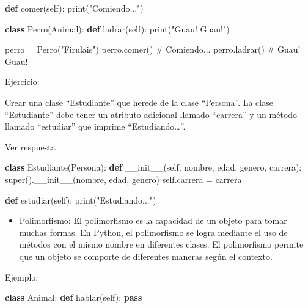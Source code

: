 \documentclass[
  a4paper,
  DIV=11,
  numbers=noendperiod,
  onepage,
  openany]{scrreprt}
\newenvironment{Shaded}{\begin{snugshade}}{\end{snugshade}}
\newcommand{\BuiltInTok}[1]{\textcolor[rgb]{0.00,0.23,0.31}{#1}}
\newcommand{\CommentTok}[1]{\textcolor[rgb]{0.37,0.37,0.37}{#1}}
\newcommand{\ControlFlowTok}[1]{\textcolor[rgb]{0.00,0.23,0.31}{\textbf{#1}}}
\newcommand{\FunctionTok}[1]{\textcolor[rgb]{0.28,0.35,0.67}{#1}}
\newcommand{\KeywordTok}[1]{\textcolor[rgb]{0.00,0.23,0.31}{\textbf{#1}}}
\newcommand{\NormalTok}[1]{\textcolor[rgb]{0.00,0.23,0.31}{#1}}
\newcommand{\OperatorTok}[1]{\textcolor[rgb]{0.37,0.37,0.37}{#1}}
\newcommand{\StringTok}[1]{\textcolor[rgb]{0.13,0.47,0.30}{#1}}
\newcommand{\VariableTok}[1]{\textcolor[rgb]{0.07,0.07,0.07}{#1}}
\providecommand{\tightlist}{%
  \setlength{\itemsep}{0pt}\setlength{\parskip}{0pt}}\usepackage{longtable,booktabs,array}
\begin{document}
\begin{tcolorbox}
\begin{Shaded}
\begin{Highlighting}[]
    \KeywordTok{def}\NormalTok{ comer(}\VariableTok{self}\NormalTok{):}
        \BuiltInTok{print}\NormalTok{(}\StringTok{"Comiendo..."}\NormalTok{)}

\KeywordTok{class}\NormalTok{ Perro(Animal):}
    \KeywordTok{def}\NormalTok{ ladrar(}\VariableTok{self}\NormalTok{):}
        \BuiltInTok{print}\NormalTok{(}\StringTok{"Guau! Guau!"}\NormalTok{)}

\NormalTok{perro }\OperatorTok{=}\NormalTok{ Perro(}\StringTok{"Firulais"}\NormalTok{)}
\NormalTok{perro.comer()  }\CommentTok{\# Comiendo...}
\NormalTok{perro.ladrar()  }\CommentTok{\# Guau! Guau!}
\end{Highlighting}
\end{Shaded}

Ejercicio:

Crear una clase ``Estudiante'' que herede de la clase ``Persona''. La
clase ``Estudiante'' debe tener un atributo adicional llamado
``carrera'' y un método llamado ``estudiar'' que imprime
``Estudiando\ldots{}''.

Ver respuesta

\begin{Shaded}
\begin{Highlighting}[]
\KeywordTok{class}\NormalTok{ Estudiante(Persona):}
    \KeywordTok{def} \FunctionTok{\_\_init\_\_}\NormalTok{(}\VariableTok{self}\NormalTok{, nombre, edad, genero, carrera):}
        \BuiltInTok{super}\NormalTok{().}\FunctionTok{\_\_init\_\_}\NormalTok{(nombre, edad, genero)}
        \VariableTok{self}\NormalTok{.carrera }\OperatorTok{=}\NormalTok{ carrera}

    \KeywordTok{def}\NormalTok{ estudiar(}\VariableTok{self}\NormalTok{):}
        \BuiltInTok{print}\NormalTok{(}\StringTok{"Estudiando..."}\NormalTok{)}
\end{Highlighting}
\end{Shaded}

\begin{itemize}
\tightlist
\item
  Polimorfismo: El polimorfismo es la capacidad de un objeto para tomar
  muchas formas. En Python, el polimorfismo se logra mediante el uso de
  métodos con el mismo nombre en diferentes clases. El polimorfismo
  permite que un objeto se comporte de diferentes maneras según el
  contexto.
\end{itemize}

Ejemplo:

\begin{Shaded}
\begin{Highlighting}[]
\KeywordTok{class}\NormalTok{ Animal:}
    \KeywordTok{def}\NormalTok{ hablar(}\VariableTok{self}\NormalTok{):}
        \ControlFlowTok{pass}


\end{Highlighting}
\end{Shaded}
\end{tcolorbox}
\end{document}
